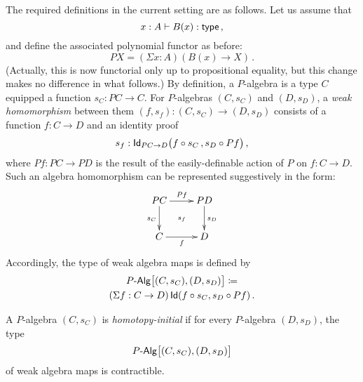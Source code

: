The required definitions in the current setting are as follows. Let us assume that
\[
x:A \vdash B(x) : \mathsf{type} \, ,
\]
and define the associated polynomial functor as before: 
\begin{equation}
\label{eq:polyfunc}
PX = (\Sigma x : A) (B(x) \rightarrow X) \, .
\end{equation}
(Actually, this is now functorial only up to propositional equality, but this change makes no difference in what follows.)
By definition, a $P$-algebra is a type $C$ equipped a function
$s_C :  PC \rightarrow C$. For $P$-algebras $(C,s_C)$ and $(D,s_D)$, a \emph{weak 
homomorphism} between them $(f, s_f) : (C, s_C) \rightarrow (D, s_D)$
consists of a function $f : C \rightarrow D$ and an identity proof
\[
s_f : \mathsf{Id}_{PC \rightarrow D}\big( f \circ s_C \, ,  s_{D} \circ Pf \big) \, ,
\]
where $Pf : PC\rightarrow PD$ is the result of the easily-definable action of $P$ on $f: C \rightarrow D$. Such an algebra homomorphism can be represented suggestively in the form:
\[
\xymatrix{
 PC \ar[d]_{s_C} \ar[r]^{Pf}  \ar@{}[dr]|{s_f} &  PD \ar[d]^{s_D}\\
C \ar[r]_{f}   & D }
\] 
Accordingly, the type of weak algebra maps is defined by
\begin{multline*}
\Palg
\big[ (C,s_C), (D, s_D)  \big]
 \defeq   \\
(\Sigma f:  C \rightarrow D) \, \Id(f\circ s_C, s_D\circ Pf) \, .
\end{multline*}


\begin{definition} 
A $P$-algebra $(C, s_C)$ is \emph{homotopy-initial} if for every $P$-algebra $(D, s_D)$, the type 
$$\Palg \big[ (C, s_C), (D, s_D) \big]$$ of weak algebra maps is contractible.
\end{definition} 


